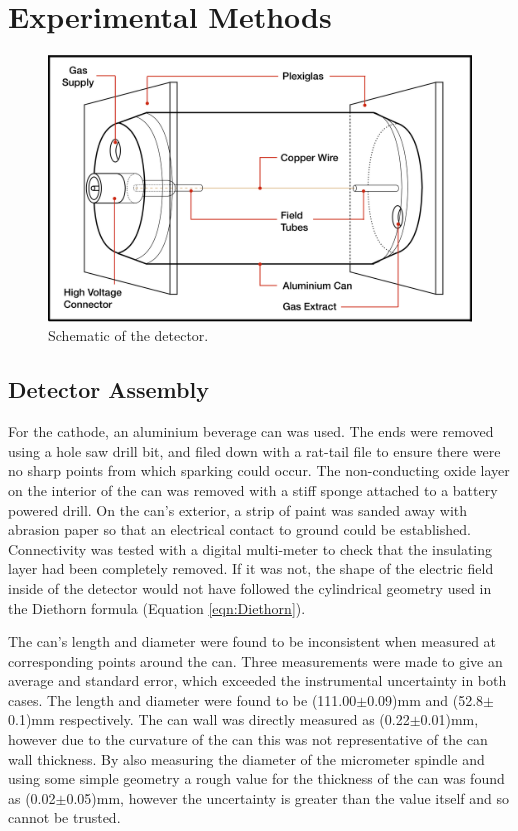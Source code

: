 \chapter{Experimental Methods}

\begin{figure}[h]
  \centering
  \includegraphics[width=\textwidth]{detectorSchematic.png}
  \caption{Schematic of the detector.}
  \label{fig:schematic}
\end{figure}

\section{Detector Assembly}

For the cathode, an aluminium beverage can was used. The ends were removed using a hole saw drill bit, and filed down with a rat-tail file to ensure there were no sharp points from which sparking could occur. The non-conducting oxide layer on the interior of the can was removed with a stiff sponge attached to a battery powered drill. On the can's exterior, a strip of paint was sanded away with abrasion paper so that an electrical contact to ground could be established. Connectivity was tested with a digital multi-meter to check that the insulating layer had been completely removed. If it was not, the shape of the electric field inside of the detector would not have followed the cylindrical geometry used in the Diethorn formula (Equation \ref{eqn:Diethorn}).

The can's length and diameter were found to be inconsistent when measured at corresponding points around the can. Three measurements were made to give an average and standard error, which exceeded the instrumental uncertainty in both cases. The length and diameter were found to be (111.00$\pm$0.09)mm and (52.8$\pm$0.1)mm respectively. The can wall was directly measured as (0.22$\pm$0.01)mm, however due to the curvature of the can this was not representative of the can wall thickness. By also measuring the diameter of the micrometer spindle and using some simple geometry a rough value for the thickness of the can was found as (0.02$\pm$0.05)mm, however the uncertainty is greater than the value itself and so cannot be trusted.

